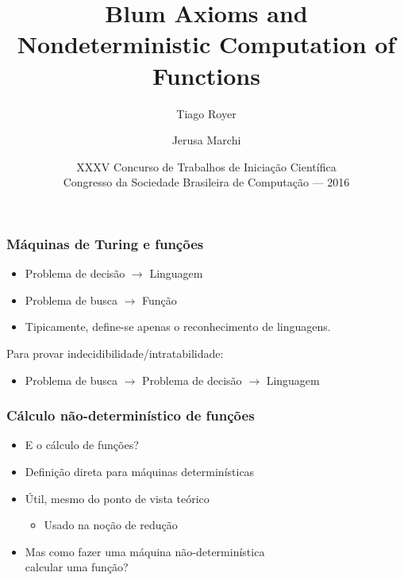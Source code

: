 \documentclass[utf8,notheorems]{beamer}
\theoremstyle{definition}
\begin{document}
\title{Blum Axioms and Nondeterministic Computation of Functions}
\author{Tiago Royer \and Jerusa Marchi}
\date[XXXV CTIC]{
    XXXV Concurso de Trabalhos de Iniciação Científica \\
    Congresso da Sociedade Brasileira de Computação --- 2016
}

\begin{frame}
    \titlepage
\end{frame}

\begin{frame}
    \frametitle{Máquinas de Turing e funções}
    \begin{itemize}
        \item Problema de decisão $\rightarrow$ Linguagem
        \item Problema de busca $\rightarrow$ Função
        \item Tipicamente, define-se apenas o reconhecimento de linguagens. \\
    \end{itemize}

    Para provar indecidibilidade/intratabilidade:
    \begin{itemize}
        \item Problema de busca $\rightarrow$ Problema de decisão
            $\rightarrow$ Linguagem
    \end{itemize}
\end{frame}

\begin{frame}
    \frametitle{Cálculo não-determinístico de funções}
    \begin{itemize}
        \item E o cálculo de funções?
        \item Definição direta para máquinas determinísticas
        \item Útil, mesmo do ponto de vista teórico
            \begin{itemize}
                \item Usado na noção de redução
            \end{itemize}
        \item Mas como fazer uma máquina não-determinística \\
            calcular uma função?
    \end{itemize}
\end{frame}
\end{document}
